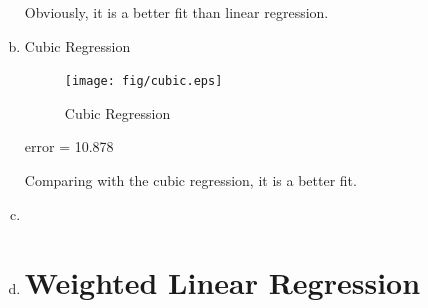 \documentclass[a4paper, 12pt, titlepage]{article}
\begin{document}
\begin{enumerate}[(a)]
            Obviously, it is a better fit than linear regression.

        \item Cubic Regression %
            \begin{figure}[H]
                \centering
                \texttt{[image: fig/cubic.eps]}
                \caption{Cubic Regression}\label{f}
            \end{figure}

            error = 10.878

            Comparing with the cubic regression, it is a better fit.

        \item %

        \item %


\section{Weighted Linear Regression}
            

\end{enumerate}
\end{document}
